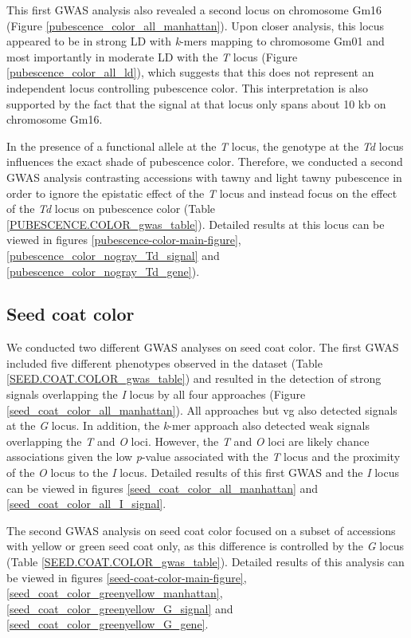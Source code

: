 This first GWAS analysis also revealed a second locus on chromosome Gm16
(Figure \ref{pubescence_color_all_manhattan}). Upon closer analysis, this locus
appeared to be in strong LD with \emph{k}-mers mapping to chromosome Gm01 and
most importantly in moderate LD with the \emph{T} locus (Figure
\ref{pubescence_color_all_ld}), which suggests that this does not represent an
independent locus controlling pubescence color. This interpretation is also
supported by the fact that the signal at that locus only spans about 10 kb on
chromosome Gm16.

In the presence of a functional allele at the \emph{T} locus, the genotype at
the \emph{Td} locus influences the exact shade of pubescence color.  Therefore,
we conducted a second GWAS analysis contrasting accessions with tawny and light
tawny pubescence in order to ignore the epistatic effect of the \emph{T} locus
and instead focus on the effect of the \emph{Td} locus on pubescence color
(Table \ref{PUBESCENCE.COLOR_gwas_table}). Detailed results at this locus
can be viewed in figures \ref{pubescence-color-main-figure}, \ref{pubescence_color_nogray_Td_signal} and
\ref{pubescence_color_nogray_Td_gene}). 

\subsection*{Seed coat color}
\label{sv-gwas-seed-coat-color}

We conducted two different GWAS analyses on seed coat color. The first GWAS
included five different phenotypes observed in the dataset (Table
\ref{SEED.COAT.COLOR_gwas_table}) and resulted in the detection of strong
signals overlapping the \emph{I} locus by all four approaches (Figure
\ref{seed_coat_color_all_manhattan}). All approaches but vg also detected
signals at the \emph{G} locus. In addition, the \emph{k}-mer approach also
detected weak signals overlapping the \emph{T} and \emph{O} loci. However, the
\emph{T} and \emph{O} loci are likely chance associations given the low \textit{p}-value
associated with the \emph{T} locus and the proximity of the \emph{O} locus to
the \emph{I} locus. Detailed results of this first GWAS and the \textit{I}
locus can be viewed in figures \ref{seed_coat_color_all_manhattan} and
\ref{seed_coat_color_all_I_signal}.

The second GWAS analysis on seed coat color focused on a subset of accessions
with yellow or green seed coat only, as this difference is controlled by the
\emph{G} locus (Table \ref{SEED.COAT.COLOR_gwas_table}). Detailed results of
this analysis can be viewed in figures \ref{seed-coat-color-main-figure},
\ref{seed_coat_color_greenyellow_manhattan},
\ref{seed_coat_color_greenyellow_G_signal} and
\ref{seed_coat_color_greenyellow_G_gene}.

